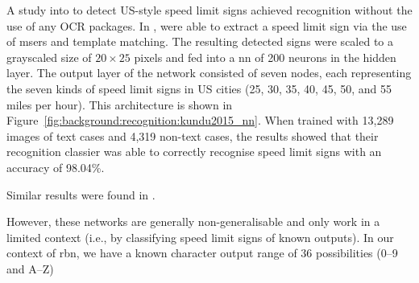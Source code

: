 A \citeyear{Kundu:2015vq} study into  to detect US-style speed limit signs achieved recognition without the use of any OCR packages. In \citep{Kundu:2015vq}, \citeauthor{Kundu:2015vq} were able to extract a speed limit sign via the use of \glspl{mser} and template matching. The resulting detected signs were scaled to a grayscaled size of $20 \times 25$ pixels and fed into a  \gls{nn} of 200 neurons in the hidden layer. The output layer of the network consisted of seven nodes, each representing the seven kinds of speed limit signs in US cities (25, 30, 35, 40, 45, 50, and 55 miles per hour). This architecture is shown in Figure~\ref{fig:background:recognition:kundu2015_nn}. When trained with 13,289 images of text cases and 4,319 non-text cases, the results showed that their recognition classier was able to correctly recognise speed limit signs with an accuracy of 98.04\%.

Similar results were found in .

However, these networks are generally non-generalisable and only work in a limited context (i.e., by classifying speed limit signs of known outputs). In our context of \gls{rbn}, we have a known character output range of 36 possibilities (0--9 and A--Z) 

